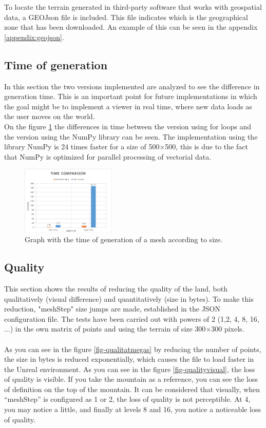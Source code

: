 \documentclass[10pt,a4paper,twocolumn,twoside]{article}
\begin{document}
To locate the terrain generated in third-party software that works with geospatial data, a GEOJson file is included. This file indicates which is the geographical zone that has been downloaded. An example of this can be seen in the appendix \ref{appendix:geojson}.


\subsection{Time of generation}
In this section the two versions implemented are analyzed to see the difference in generation time. This is an important point for future implementations in which the goal might be to implement a viewer in real time, where new data loads as the user moves on the world.
\\
On the figure \ref{fig-meshtime} the differences in time between the version using for loops and the version using the NumPy library can be seen. The implementation using the library NumPy is 24 times faster for a size of 500$\times$500, this is due to the fact that NumPy is optimized for parallel processing of vectorial data.

\begin{figure}[h]
\centering
  	\includegraphics[width=0.4\textwidth]{meshtime}
	\caption{Graph with the time of generation of a mesh according to size.}
	\label{fig-meshtime}
\end{figure}

\subsection{Quality}
\label{qualitat}
This section shows the results of reducing the quality of the land, both qualitatively (visual difference) and quantitatively (size in bytes). To make this reduction, "meshStep" size jumps are made, established in the JSON configuration file. The tests have been carried out with powers of 2 (1,2, 4, 8, 16, ...) in the own matrix of points and using the terrain of size 300$\times$300 pixels.
\\
\\
As you can see in the figure \ref{fig-qualitatmegas} by reducing the number of points, the size in bytes is reduced exponentially, which causes the file to load faster in the Unreal environment. As you can see in the figure \ref{fig-qualityvisual}, the loss of quality is visible. If you take the mountain as a reference, you can see the loss of definition on the top of the mountain. It can be considered that visually, when ``meshStep'' is configured as 1 or 2, the loss of quality is not perceptible. At 4, you may notice a little, and finally at levels 8 and 16, you notice a noticeable loss of quality.
\end{document}
